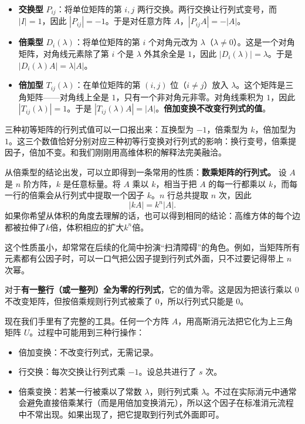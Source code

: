 \documentclass[UTF8]{ctexbook}
\begin{document}
\begin{itemize}
  \item \textbf{交换型} $P_{ij}$：将单位矩阵的第 $i,j$ 两行交换。两行交换让行列式变号，而 $|I|=1$，因此 $|P_{ij}|=-1$。于是对任意方阵 $A$，$|P_{ij}A|=-|A|$。
  
  \item \textbf{倍乘型} $D_i(\lambda)$：将单位矩阵的第 $i$ 个对角元改为 $\lambda$（$\lambda\neq 0$）。这是一个对角矩阵，对角线元素除了第 $i$ 个是 $\lambda$ 外其余全是 $1$，因此 $|D_i(\lambda)|=\lambda$。于是 $|D_i(\lambda)A|=\lambda|A|$。
  
  \item \textbf{倍加型} $T_{ij}(\lambda)$：在单位矩阵的第 $(i,j)$ 位（$i\neq j$）放入 $\lambda$。这个矩阵是三角矩阵——对角线上全是 $1$，只有一个非对角元非零。对角线乘积为 $1$，因此 $|T_{ij}(\lambda)|=1$。于是 $|T_{ij}(\lambda)A|=|A|$。\textbf{倍加变换不改变行列式的值}。
\end{itemize}

三种初等矩阵的行列式值可以一口报出来：互换型为 $-1$，倍乘型为 $k$，倍加型为 $1$。这三个数值恰好分别对应三种初等行变换对行列式的影响：换行变号，倍乘提因子，倍加不变。和我们刚刚用高维体积的解释法完美融洽。

从倍乘型的结论出发，可以立即得到一条常用的性质：\textbf{数乘矩阵的行列式。}
设 $A$ 是 $n$ 阶方阵，$k$ 是任意标量。将 $A$ 乘以 $k$，相当于把 $A$ 的每一行都乘以 $k$，而每一行的倍乘会从行列式中提取一个因子 $k$。$n$ 行总共提取 $n$ 次，因此
\[
|kA| = k^n |A|.
\]
如果你希望从体积的角度去理解的话，也可以得到相同的结论：高维方体的每个边都被拉伸了$k$倍，体积相应的扩大$k^n$倍。

这个性质虽小，却常常在后续的化简中扮演“扫清障碍”的角色。例如，当矩阵所有元素都有公因子时，可以一口气把公因子提到行列式外面，只不过要记得带上 $n$ 次幂。

对于\textbf{有一整行（或一整列）全为零的行列式}，它的值为零。这是因为把该行乘以 $0$ 不改变矩阵，但按倍乘规则行列式被乘了 $0$，所以行列式只能是 $0$。

现在我们手里有了完整的工具。任何一个方阵 $A$，用高斯消元法把它化为上三角矩阵 $U$。过程中可能用到三种行操作：

\begin{itemize}
  \item 倍加变换：不改变行列式，无需记录。
  \item 行交换：每次交换让行列式乘 $-1$。设总共进行了 $s$ 次。
  \item 倍乘变换：若某一行被乘以了常数 $\lambda$，则行列式乘 $\lambda$。不过在实际消元中通常会避免直接倍乘某行（而是用倍加变换消元），所以这个因子在标准消元流程中不常出现。如果出现了，把它提取到行列式外面即可。
\end{itemize}
\end{document}
